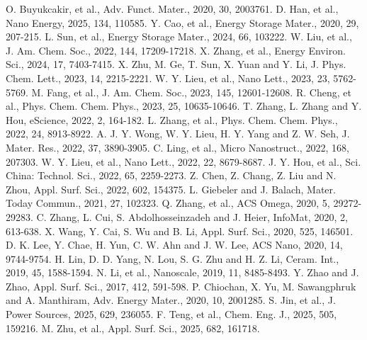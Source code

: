 \documentclass[12pt,a4paper,twocolumn]{article} %
\newcommand{\english}[1]{\textenglish{#1}}
\begin{document}
 \english{O. Buyukcakir, et al., Adv. Funct. Mater., 2020, 30, 2003761.}
 \english{D. Han, et al., Nano Energy, 2025, 134, 110585.}
 \english{Y. Cao, et al., Energy Storage Mater., 2020, 29, 207-215.}
 \english{L. Sun, et al., Energy Storage Mater., 2024, 66, 103222.}
 \english{W. Liu, et al., J. Am. Chem. Soc., 2022, 144, 17209-17218.}
 \english{X. Zhang, et al., Energy Environ. Sci., 2024, 17, 7403-7415.}
 \english{X. Zhu, M. Ge, T. Sun, X. Yuan and Y. Li, J. Phys. Chem. Lett., 2023, 14, 2215-2221.}
 \english{W. Y. Lieu, et al., Nano Lett., 2023, 23, 5762-5769.}
 \english{M. Fang, et al., J. Am. Chem. Soc., 2023, 145, 12601-12608.}
 \english{R. Cheng, et al., Phys. Chem. Chem. Phys., 2023, 25, 10635-10646.}
 \english{T. Zhang, L. Zhang and Y. Hou, eScience, 2022, 2, 164-182.}
 \english{L. Zhang, et al., Phys. Chem. Chem. Phys., 2022, 24, 8913-8922.}
 \english{A. J. Y. Wong, W. Y. Lieu, H. Y. Yang and Z. W. Seh, J. Mater. Res., 2022, 37, 3890-3905.}
 \english{C. Ling, et al., Micro Nanostruct., 2022, 168, 207303.}
 \english{W. Y. Lieu, et al., Nano Lett., 2022, 22, 8679-8687.}
 \english{J. Y. Hou, et al., Sci. China: Technol. Sci., 2022, 65, 2259-2273.}
 \english{Z. Chen, Z. Chang, Z. Liu and N. Zhou, Appl. Surf. Sci., 2022, 602, 154375.}
 \english{L. Giebeler and J. Balach, Mater. Today Commun., 2021, 27, 102323.}
 \english{Q. Zhang, et al., ACS Omega, 2020, 5, 29272-29283.}
 \english{C. Zhang, L. Cui, S. Abdolhosseinzadeh and J. Heier, InfoMat, 2020, 2, 613-638.}
 \english{X. Wang, Y. Cai, S. Wu and B. Li, Appl. Surf. Sci., 2020, 525, 146501.}
 \english{D. K. Lee, Y. Chae, H. Yun, C. W. Ahn and J. W. Lee, ACS Nano, 2020, 14, 9744-9754.}
 \english{H. Lin, D. D. Yang, N. Lou, S. G. Zhu and H. Z. Li, Ceram. Int., 2019, 45, 1588-1594.}
 \english{N. Li, et al., Nanoscale, 2019, 11, 8485-8493.}
 \english{Y. Zhao and J. Zhao, Appl. Surf. Sci., 2017, 412, 591-598.}
 \english{P. Chiochan, X. Yu, M. Sawangphruk and A. Manthiram, Adv. Energy Mater., 2020, 10, 2001285.}
 \english{S. Jin, et al., J. Power Sources, 2025, 629, 236055.}
 \english{F. Teng, et al., Chem. Eng. J., 2025, 505, 159216.}
 \english{M. Zhu, et al., Appl. Surf. Sci., 2025, 682, 161718.}
\end{document}
